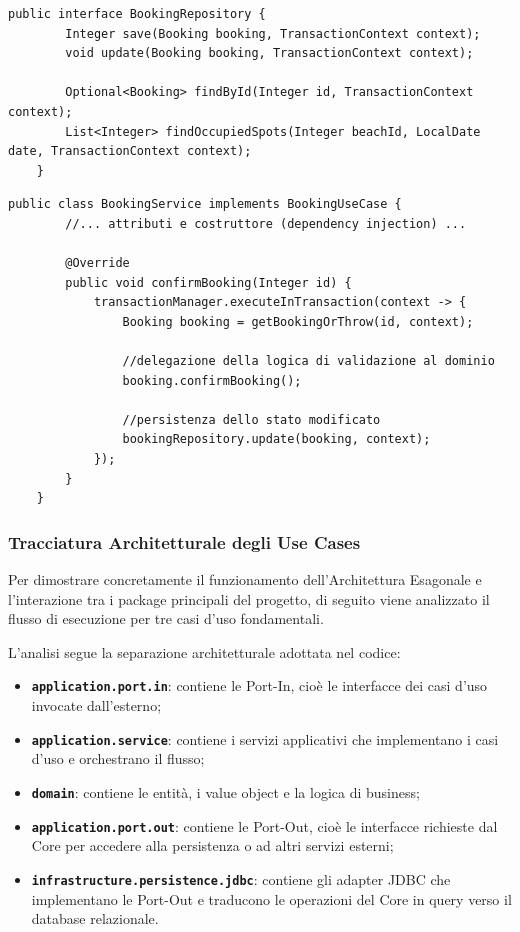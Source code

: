\documentclass[a4paper,11pt]{article}
\begin{document}
\begin{lstlisting}[caption={Esempio Port-Out (Requisiti verso il Database)}, label={lst:Repository}]
	public interface BookingRepository {
		Integer save(Booking booking, TransactionContext context);
		void update(Booking booking, TransactionContext context);
		
		Optional<Booking> findById(Integer id, TransactionContext context);
		List<Integer> findOccupiedSpots(Integer beachId, LocalDate date, TransactionContext context);
	}
\end{lstlisting}

\newpage

\begin{lstlisting}[caption={Esempio Service (Orchestrazione e Transazionalità)}, label={lst:Service}]
	public class BookingService implements BookingUseCase {
		//... attributi e costruttore (dependency injection) ...
		
		@Override
		public void confirmBooking(Integer id) {
			transactionManager.executeInTransaction(context -> {
				Booking booking = getBookingOrThrow(id, context);
				
				//delegazione della logica di validazione al dominio
				booking.confirmBooking();
				
				//persistenza dello stato modificato
				bookingRepository.update(booking, context);
			});
		}
	}   
\end{lstlisting}


\subsubsection{Tracciatura Architetturale degli Use Cases}
Per dimostrare concretamente il funzionamento dell'Architettura Esagonale e l'interazione tra i package principali del progetto, di seguito viene analizzato il flusso di esecuzione per tre casi d'uso fondamentali.

L'analisi segue la separazione architetturale adottata nel codice:
\begin{itemize}
	\item \textbf{\texttt{application.port.in}}: contiene le Port-In, cioè le interfacce dei casi d'uso invocate dall'esterno;
	\item \textbf{\texttt{application.service}}: contiene i servizi applicativi che implementano i casi d'uso e orchestrano il flusso;
	\item \textbf{\texttt{domain}}: contiene le entità, i value object e la logica di business;
	\item \textbf{\texttt{application.port.out}}: contiene le Port-Out, cioè le interfacce richieste dal Core per accedere alla persistenza o ad altri servizi esterni;
	\item \textbf{\texttt{infrastructure.persistence.jdbc}}: contiene gli adapter JDBC che implementano le Port-Out e traducono le operazioni del Core in query verso il database relazionale.
\end{itemize}
\end{document}
